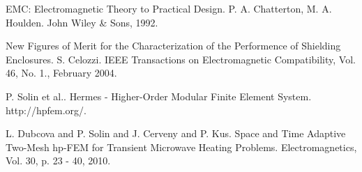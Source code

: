 
\begin{thebibliography}{10}

{\sc EMC: Electromagnetic Theory to Practical Design}. {P. A. Chatterton, M. A. Houlden}. John Wiley \& Sons, 1992.



{\sc New Figures of Merit for the Characterization of the Performence of Shielding Enclosures}. {S. Celozzi}. IEEE Transactions on Electromagnetic Compatibility, Vol. 46, No. 1., February 2004.



{\sc P. Solin et al.}. {Hermes - Higher-Order Modular Finite Element System}. http://hpfem.org/.



{\sc L. Dubcova and P. Solin and J. Cerveny and P. Kus}. {Space and Time Adaptive Two-Mesh hp-FEM for Transient Microwave Heating Problems}. Electromagnetics, Vol. 30, p. 23 - 40, 2010.

\end{thebibliography}
